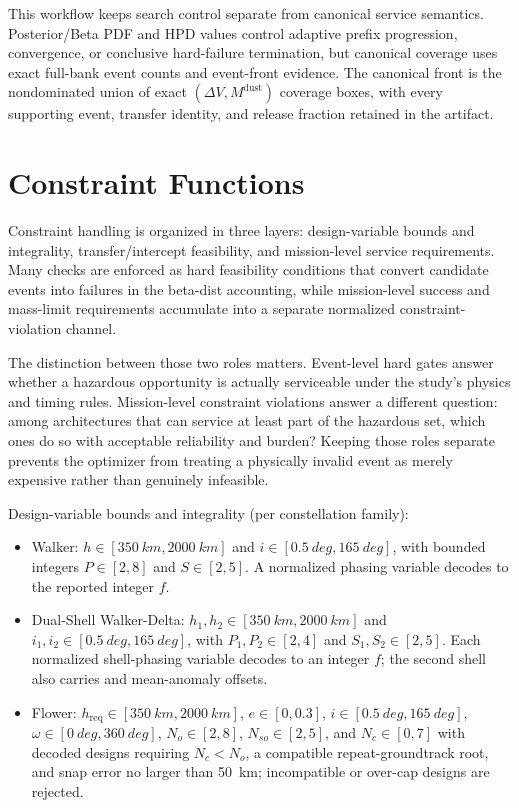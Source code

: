     \clearpage

    This workflow keeps search control separate from canonical service semantics. Posterior/Beta PDF and HPD values control adaptive prefix progression, convergence, or conclusive hard-failure termination, but canonical coverage uses exact full-bank event counts and event-front evidence. The canonical front is the nondominated union of exact \((\Delta V,M^{\mathrm{dust}})\) coverage boxes, with every supporting event, transfer identity, and release fraction retained in the artifact.

\section{Constraint Functions} \label{se:constraints}
    Constraint handling is organized in three layers: design-variable bounds and integrality, transfer/intercept feasibility, and mission-level service requirements. Many checks are enforced as hard feasibility conditions that convert candidate events into failures in the beta-dist accounting, while mission-level success and mass-limit requirements accumulate into a separate normalized constraint-violation channel.

    The distinction between those two roles matters. Event-level hard gates answer whether a hazardous opportunity is actually serviceable under the study's physics and timing rules. Mission-level constraint violations answer a different question: among architectures that can service at least part of the hazardous set, which ones do so with acceptable reliability and burden? Keeping those roles separate prevents the optimizer from treating a physically invalid event as merely expensive rather than genuinely infeasible.

    Design-variable bounds and integrality (per constellation family):
    \begin{itemize}[leftmargin=*]
        \item Walker: $h\in[\SI{350}{km},\SI{2000}{km}]$ and $i\in[\SI{0.5}{deg},\SI{165}{deg}]$, with bounded integers \(P\in[2,8]\) and \(S\in[2,5]\). A normalized phasing variable decodes to the reported integer \(f\).
        \item Dual-Shell Walker-Delta: \(h_1,h_2\in[\SI{350}{km},\SI{2000}{km}]\) and \(i_1,i_2\in[\SI{0.5}{deg},\SI{165}{deg}]\), with \(P_1,P_2\in[2,4]\) and \(S_1,S_2\in[2,5]\). Each normalized shell-phasing variable decodes to an integer \(f\); the second shell also carries  and mean-anomaly offsets.
        \item Flower: \(h_{\mathrm{req}}\in[\SI{350}{km},\SI{2000}{km}]\), \(e\in[0,0.3]\), \(i\in[\SI{0.5}{deg},\SI{165}{deg}]\), \(\omega\in[\SI{0}{deg},\SI{360}{deg}]\), \(N_o\in[2,8]\), \(N_{so}\in[2,5]\), and \(N_c\in[0,7]\) with decoded designs requiring \(N_c<N_o\), a compatible repeat-groundtrack root, and snap error no larger than \SI{50}{\kilo\metre}; incompatible or over-cap designs are rejected.
    \end{itemize}

